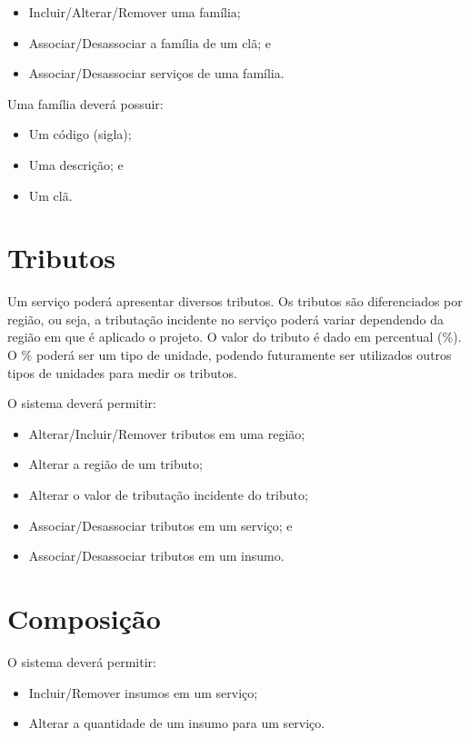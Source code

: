\begin{itemize}
	\item Incluir/Alterar/Remover uma família;
	\item Associar/Desassociar a família de um clã; e
	\item Associar/Desassociar serviços de uma família.
\end{itemize}

Uma família deverá possuir:

\begin{itemize}
	\item Um código (sigla);
	\item Uma descrição; e
	\item Um clã.
\end{itemize}

\section{Tributos}

Um serviço poderá apresentar diversos tributos. Os tributos são diferenciados por região, ou seja, a tributação incidente no serviço poderá variar dependendo da região em que é aplicado o projeto. O valor do tributo é dado em percentual (\%). O \% poderá ser um tipo de unidade, podendo futuramente ser utilizados outros tipos de unidades para medir os tributos.

O sistema deverá permitir:

\begin{itemize}
	\item Alterar/Incluir/Remover tributos em uma região;
	\item Alterar a região de um tributo;
	\item Alterar o valor de tributação incidente do tributo;
	\item Associar/Desassociar tributos em um serviço; e
	\item Associar/Desassociar tributos em um insumo.
\end{itemize}

\section{Composição}

O sistema deverá permitir:

\begin{itemize}
	\item Incluir/Remover insumos em um serviço;
	\item Alterar a quantidade de um insumo para um serviço.
\end{itemize}

